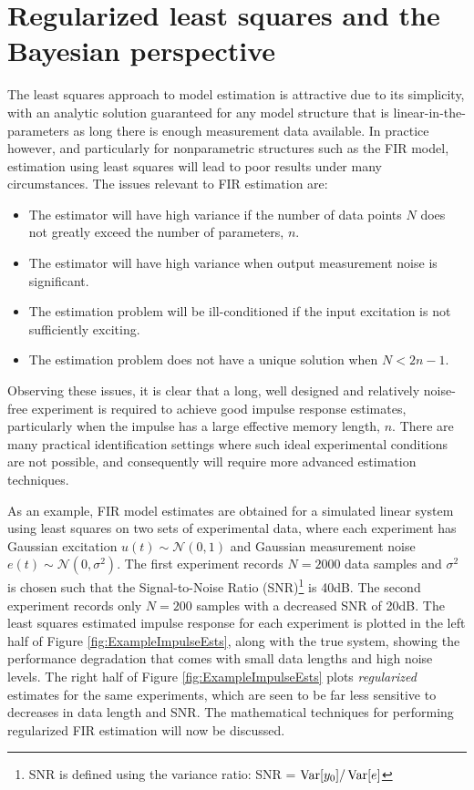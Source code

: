 \section{Regularized least squares and the Bayesian perspective}
\label{sec:ReLS_Chap2}

The least squares approach to model estimation is attractive due to its simplicity, with an analytic solution guaranteed for any model structure that is linear-in-the-parameters as long there is enough measurement data available. In practice however, and particularly for nonparametric structures such as the FIR model, estimation using least squares will lead to poor results under many circumstances. The issues relevant to FIR estimation are:
\begin{itemize}
\item The estimator will have high variance if the number of data points $N$ does not greatly exceed the number of parameters, $n$.
\item The estimator will have high variance when output measurement noise is significant.
\item The estimation problem will be ill-conditioned if the input excitation is not sufficiently exciting.
\item The estimation problem does not have a unique solution when $N < 2n-1$.  
\end{itemize} 
Observing these issues, it is clear that a long, well designed and relatively noise-free experiment is required to achieve good impulse response estimates, particularly when the impulse has a large effective memory length, $n$. There are many practical identification settings where such ideal experimental conditions are not possible, and consequently will require more advanced estimation techniques. 

As an example, FIR model estimates are obtained for a simulated linear system using least squares on two sets of experimental data, where each experiment has Gaussian excitation $u(t) \sim \mathcal{N}(0,1)$ and Gaussian measurement noise $e(t) \sim \mathcal{N}(0,\sigma^2)$.  The first experiment records $N=2000$ data samples and $\sigma^2$ is chosen such that the Signal-to-Noise Ratio (SNR)\footnote{SNR is defined using the variance ratio: SNR = $\operatorname{Var} [y_0]/\operatorname{Var} [e]$} is 40dB. The second experiment records only $N=200$ samples with a decreased SNR of 20dB. The least squares estimated impulse response for each experiment is plotted in the left half of Figure \ref{fig:ExampleImpulseEsts}, along with the true system, showing the performance degradation that comes with small data lengths and high noise levels. The right half of Figure \ref{fig:ExampleImpulseEsts} plots \emph{regularized} estimates for the same experiments, which are seen to be far less sensitive to decreases in data length and SNR. The mathematical techniques for performing regularized FIR estimation will now be discussed.

